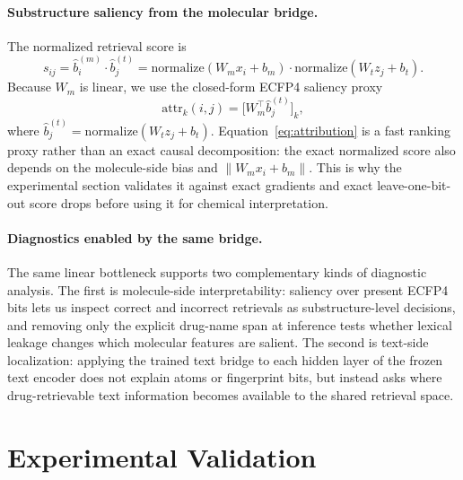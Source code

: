 \documentclass{article}
\begin{document}
\paragraph{Substructure saliency from the molecular bridge.}
The normalized retrieval score is
\[
s_{ij}=\hat{b}_i^{(m)}\cdot\hat{b}_j^{(t)}
=\mathrm{normalize}(W_m x_i+b_m)\cdot\mathrm{normalize}(W_t z_j+b_t).
\]
Because $W_m$ is linear, we use the closed-form ECFP4 saliency proxy
\begin{equation}
\label{eq:attribution}
\mathrm{attr}_k(i,j)=\bigl[W_m^\top\hat{b}_j^{(t)}\bigr]_k,
\end{equation}
where $\hat{b}_j^{(t)}=\mathrm{normalize}(W_tz_j+b_t)$. Equation~\ref{eq:attribution} is a fast ranking proxy rather than an exact causal decomposition: the exact normalized score also depends on the molecule-side bias and $\|W_mx_i+b_m\|$. This is why the experimental section validates it against exact gradients and exact leave-one-bit-out score drops before using it for chemical interpretation.

\paragraph{Diagnostics enabled by the same bridge.}
The same linear bottleneck supports two complementary kinds of diagnostic analysis. The first is molecule-side interpretability: saliency over present ECFP4 bits lets us inspect correct and incorrect retrievals as substructure-level decisions, and removing only the explicit drug-name span at inference tests whether lexical leakage changes which molecular features are salient. The second is text-side localization: applying the trained text bridge to each hidden layer of the frozen text encoder does not explain atoms or fingerprint bits, but instead asks where drug-retrievable text information becomes available to the shared retrieval space.

\section{Experimental Validation}
\label{sec:experiments}
\end{document}
